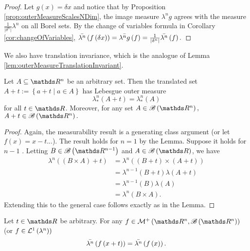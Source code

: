 \begin{proof}
Let $g\left(x\right)=\delta x$ and notice that by Proposition \ref{prop:outerMeasureScalesNDim},
the image measure $\lambda^{n}g$ agrees with the measure $\frac{1}{\lvert\delta^{n}\rvert}\lambda^{n}$
on all Borel sets. By the change of variables formula in Corollary
\ref{cor:changeOfVariables}, $\bar{\lambda^{n}}\left(f\left(\delta x\right)\right)=\bar{\lambda^{n}g}\left(f\right)=\frac{1}{\lvert\delta^{n}\rvert}\bar{\lambda^{n}}\left(f\right).$
\end{proof}
We also have translation invariance, which is the analogue of Lemma
\ref{lem:outerMeasureTranslationInvariant}.
\begin{prop}
\label{prop:outerMeasureTranslationInvariantNDim}Let $A\subseteq\R^{n}$
be an arbitrary set. Then the translated set $A+t:=\left\{ a+t\mid a\in A\right\} $
has Lebesgue outer measure
\[
\lambda_{*}^{n}\left(A+t\right)=\lambda_{*}^{n}\left(A\right)
\]
for all $t\in\R$. Moreover, for any set $A\in\borel\left(\R^{n}\right),$$A+t\in\borel\left(\R^{n}\right).$
\end{prop}

\begin{proof}
Again, the measurability result is a generating class argument (or
let $f\left(x\right)=x-t$...). The result holds for $n=1$ by the
Lemma. Suppose it holds for $n-1$ . Letting $B\in\borel\left(\R^{n-1}\right)$
and $A\in\borel\left(\R\right)$, we have 
\begin{align*}
\lambda^{n}\left(\left(B\times A\right)+t\right) & =\lambda^{n}\left(\left(B+t\right)\times\left(A+t\right)\right)\\
 & =\lambda^{n-1}\left(B+t\right)\lambda\left(A+t\right)\\
 & =\lambda^{n-1}\left(B\right)\lambda\left(A\right)\\
 & =\lambda^{n}\left(B\times A\right).
\end{align*}
Extending this to the general case follows exactly as in the Lemma.
\end{proof}
\begin{cor}
\label{cor:translationInvarianceIntegral}Let $t\in\R$ be arbitrary.
For any $f\in\mathcal{M}^{+}\left(\R^{n},\borel\left(\R^{n}\right)\right)$
(or $f\in\mathcal{L}^{1}\left(\lambda^{n}\right))$
\[
\bar{\lambda^{n}}\left(f\left(x+t\right)\right)=\bar{\lambda^{n}}\left(f\left(x\right)\right).
\]
\end{cor}

